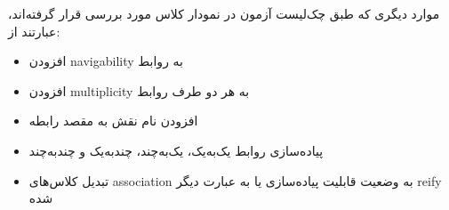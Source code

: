 موارد دیگری که طبق چک‌لیست آزمون در نمودار کلاس مورد بررسی قرار گرفته‌اند، عبارتند از:
\begin{itemize}
	\item افزودن navigability به روابط
	\item افزودن multiplicity به هر دو طرف روابط
	\item افزودن نام نقش به مقصد رابطه
	\item پیاده‌سازی روابط یک‌به‌یک، یک‌به‌چند، چند‌به‌یک و چندبه‌چند
	\item تبدیل کلاس‌های association به وضعیت قابلیت پیاده‌سازی یا به عبارت دیگر reify شده
\end{itemize}
